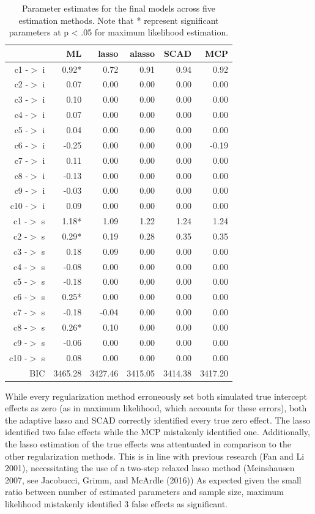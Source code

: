 \documentclass[article]{jss}
\begin{document}
\begin{table}[ht]
\centering
\begin{tabular}{rrrrrr}
  \hline
 & ML & lasso & alasso & SCAD & MCP \\ 
  \hline
c1 -$>$ i & 0.92* & 0.72 & 0.91 & 0.94 & 0.92 \\ 
  c2 -$>$ i & 0.07 & 0.00 & 0.00 & 0.00 & 0.00 \\ 
  c3 -$>$ i & 0.10 & 0.00 & 0.00 & 0.00 & 0.00 \\ 
  c4 -$>$ i & 0.07 & 0.00 & 0.00 & 0.00 & 0.00 \\ 
  c5 -$>$ i & 0.04 & 0.00 & 0.00 & 0.00 & 0.00 \\ 
  c6 -$>$ i & -0.25 & 0.00 & 0.00 & 0.00 & -0.19 \\ 
  c7 -$>$ i & 0.11 & 0.00 & 0.00 & 0.00 & 0.00 \\ 
  c8 -$>$ i & -0.13 & 0.00 & 0.00 & 0.00 & 0.00 \\ 
  c9 -$>$ i & -0.03 & 0.00 & 0.00 & 0.00 & 0.00 \\ 
  c10 -$>$ i & 0.09 & 0.00 & 0.00 & 0.00 & 0.00 \\ 
  c1 -$>$ s & 1.18* & 1.09 & 1.22 & 1.24 & 1.24 \\ 
  c2 -$>$ s & 0.29* & 0.19 & 0.28 & 0.35 & 0.35 \\ 
  c3 -$>$ s & 0.18 & 0.09 & 0.00 & 0.00 & 0.00 \\ 
  c4 -$>$ s & -0.08 & 0.00 & 0.00 & 0.00 & 0.00 \\ 
  c5 -$>$ s & -0.18 & 0.00 & 0.00 & 0.00 & 0.00 \\ 
  c6 -$>$ s & 0.25* & 0.00 & 0.00 & 0.00 & 0.00 \\ 
  c7 -$>$ s & -0.18 & -0.04 & 0.00 & 0.00 & 0.00 \\ 
  c8 -$>$ s & 0.26* & 0.10 & 0.00 & 0.00 & 0.00 \\ 
  c9 -$>$ s & -0.06 & 0.00 & 0.00 & 0.00 & 0.00 \\ 
  c10 -$>$ s & 0.08 & 0.00 & 0.00 & 0.00 & 0.00 \\ 
  BIC & 3465.28 & 3427.46 & 3415.05 & 3414.38 & 3417.20 \\ 
   \hline
\end{tabular}
\caption{Parameter estimates for the final models across five estimation methods. Note that * represent significant parameters at p < .05 for maximum likelihood estimation.}
\end{table}

While every regularization method erroneously set both simulated true
intercept effects as zero (as in maximum likelihood, which accounts for
these errors), both the adaptive lasso and SCAD correctly identified
every true zero effect. The lasso identified two false effects while the
MCP mistakenly identified one. Additionally, the lasso estimation of the
true effects was attentuated in comparison to the other regularization
methods. This is in line with previous research (Fan and Li 2001),
necessitating the use of a two-step relaxed lasso method (Meinshausen
2007, see Jacobucci, Grimm, and McArdle (2016)) As expected given the
small ratio between number of estimated parameters and sample size,
maximum likelihood mistakenly identified 3 false effects as significant.
\end{document}
